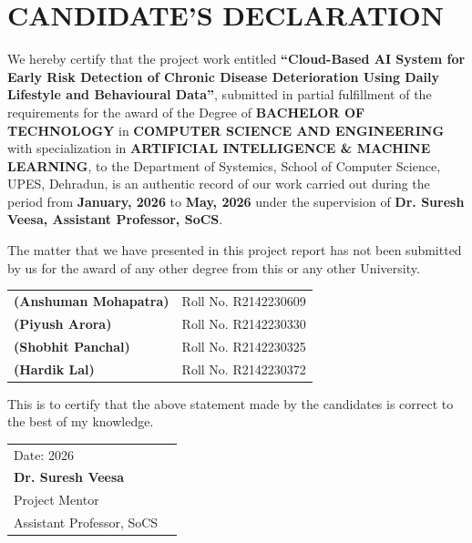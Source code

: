 \documentclass[12pt,a4paper]{report}
\begin{document}
\chapter*{CANDIDATE'S DECLARATION}
\thispagestyle{fancy}

We hereby certify that the project work entitled \textbf{``Cloud-Based AI System for Early Risk Detection of Chronic Disease Deterioration Using Daily Lifestyle and Behavioural Data''}, submitted in partial fulfillment of the requirements for the award of the Degree of \textbf{BACHELOR OF TECHNOLOGY} in \textbf{COMPUTER SCIENCE AND ENGINEERING} with specialization in \textbf{ARTIFICIAL INTELLIGENCE \& MACHINE LEARNING}, to the Department of Systemics, School of Computer Science, UPES, Dehradun, is an authentic record of our work carried out during the period from \textbf{January, 2026} to \textbf{May, 2026} under the supervision of \textbf{Dr. Suresh Veesa, Assistant Professor, SoCS}.

The matter that we have presented in this project report has not been submitted by us for the award of any other degree from this or any other University.

\vspace{1cm}

\begin{tabular}{ll}
\textbf{(Anshuman Mohapatra)} & Roll No. R2142230609 \\[12pt]
\textbf{(Piyush Arora)} & Roll No. R2142230330 \\[12pt]
\textbf{(Shobhit Panchal)} & Roll No. R2142230325 \\[12pt]
\textbf{(Hardik Lal)} & Roll No. R2142230372 \\
\end{tabular}

\vspace{1.5cm}

This is to certify that the above statement made by the candidates is correct to the best of my knowledge.

\vspace{0.8cm}

\begin{tabular}{ll}
Date: \underline{\hspace{3cm}} 2026 & \\[24pt]
\textbf{Dr. Suresh Veesa} & \\
Project Mentor & \\
Assistant Professor, SoCS & \\
\end{tabular}
\end{document}

